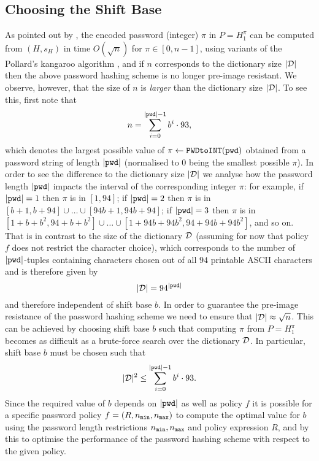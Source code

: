 \subsection{Choosing the Shift Base}\label{sec:basischoice}
As pointed out by \citet{BenhamoudaP13}, the encoded password (integer) $\pi$ in $P=H_1^\pi$ can be computed from $(H, s_H)$ in time $O(\sqrt{n})$ for $\pi \in [0,n-1]$, \eg using variants of the Pollard's kangaroo algorithm \cite{Pollard78}, and if $n$ corresponds to the dictionary size $|\mathcal{D}|$ then the above password hashing scheme is no longer pre-image resistant. 
We observe, however, that the size of $n$ is \emph{larger} than the dictionary size $|\mathcal{D}|$. 
To see this, first note that 
\[n=\sum_{i=0}^{|\mathtt{pwd}|-1}b^i\cdot 93,\] 
which denotes the largest possible value of $\pi \gets \texttt{PWDtoINT}(\mathtt{pwd})$ obtained from a password string of length $|\mathtt{pwd}|$ (normalised to $0$ being the smallest possible $\pi$). 
In order to see the difference to the dictionary size $|\mathcal{D}|$ we analyse how the password length $|\mathtt{pwd}|$ impacts the interval of the corresponding integer $\pi$: for example, if $|\mathtt{pwd}| = 1$ then $\pi$ is in $[1,94]$; if $|\mathtt{pwd}|=2$ then $\pi$ is in $[b+1,b+94]\cup \dots \cup[94b+1,94b+94]$; if $|\mathtt{pwd}|=3$ then $\pi$ is in  $[1+b+b^2,94+b+b^2]\cup\dots\cup[1+94b+94b^2,94+94b+94b^2]$, and so on. 
That is in contrast to the size of the dictionary $\mathcal{D}$ (assuming for now that policy $f$ does not restrict the character choice), which corresponds to the number of $|\mathtt{pwd}|$-tuples containing characters chosen out of all $94$ printable \ac{ASCII} characters and is therefore given by 
\[|\mathcal{D}| = 94^{|\mathtt{pwd}|}\]
and therefore independent of shift base $b$.
In order to guarantee the pre-image resistance of the password hashing scheme we need to ensure that $|\mathcal{D}| \approx \sqrt{n}$.
This can be achieved by choosing shift base $b$ such that computing $\pi$ from $P=H_1^\pi$ becomes as difficult as a brute-force search over the dictionary $\mathcal{D}$. 
In particular, shift base $b$ must be chosen such that 
\begin{equation}\label{eq:hashlimit}
  |\mathcal{D}|^2\leq \sum_{i=0}^{|\mathtt{pwd}|-1}b^i\cdot 93.
\end{equation}
Since the required value of $b$ depends on $|\mathtt{pwd}|$ as well as policy $f$ it is possible for a specific password policy $f=(R,{n_\mathtt{min}},{n_\mathtt{max}})$ to compute the optimal value for $b$ using the password length restrictions ${n_\mathtt{min}},{n_\mathtt{max}}$ and policy expression $R$, and by this to optimise the performance of the password hashing scheme with respect to the given policy. 
